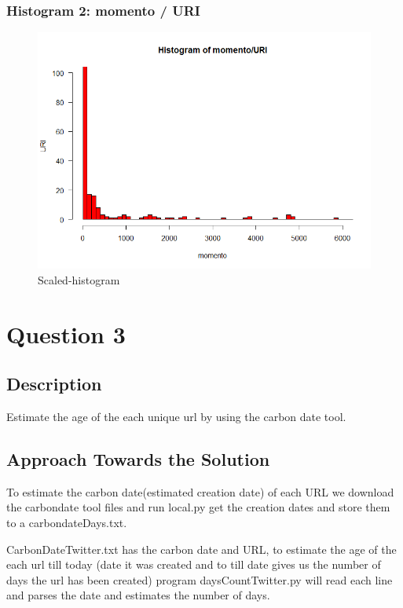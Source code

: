 \documentclass[12pt]{article}
\begin{document}
\subsubsection{Histogram 2: momento / URI}
\begin{figure}[ht]
\includegraphics[scale=0.7]{../Q2/histogramMomentoURI_2}
\centering
\caption{Scaled-histogram}
\label{fig:scaled-histogram}
\end{figure}
\newpage
\section{Question 3}
\subsection{Description}
Estimate the age of the each unique url by using the carbon date tool.
\subsection{Approach Towards the Solution}

To estimate the carbon date(estimated creation date) of each URL we download the carbondate tool files and run local.py get the creation dates and store them to a carbondateDays.txt.

CarbonDateTwitter.txt has the carbon date and URL, to estimate the age of the each url till today (date it was created and to till date gives us the number of days the url has been created) program daysCountTwitter.py will read each line and parses the date and estimates the number of days.
\end{document}
